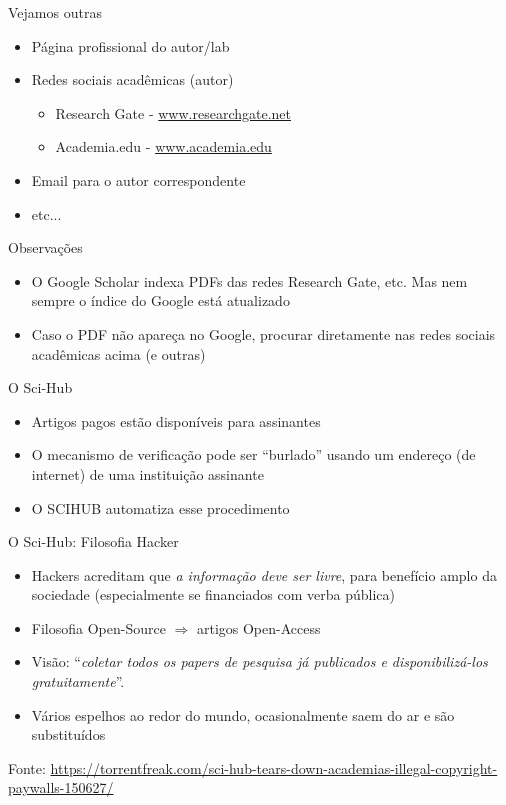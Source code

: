 \documentclass{beamer}
\begin{document}
\begin{frame}{Vejamos outras}
  \begin{itemize}
  \item Página profissional do autor/lab
  \item Redes sociais acadêmicas (autor)
    \begin{itemize}
    \item Research Gate - \url{www.researchgate.net}
    \item Academia.edu - \url{www.academia.edu}
    \end{itemize}
  \item Email para o autor correspondente
  \item etc...
  \end{itemize}
\end{frame}

\begin{frame}{Observações}
  \begin{itemize}
  \item O Google Scholar indexa PDFs das redes Research Gate, etc. Mas
    nem sempre o índice do Google está atualizado
  \item Caso o PDF não apareça no Google, procurar diretamente nas
    redes sociais acadêmicas acima (e outras)
  \end{itemize}
\end{frame}

\begin{frame}{O Sci-Hub}
  \begin{itemize}
  \item Artigos pagos estão disponíveis para assinantes
  \item O mecanismo de verificação pode ser ``burlado'' usando um
    endereço (de internet) de uma instituição assinante
  \item O SCIHUB automatiza esse procedimento
  \end{itemize}
\end{frame}

\begin{frame}{O Sci-Hub: Filosofia Hacker}
  \begin{itemize}
  \item Hackers acreditam que {\em a informação deve ser livre}, para
    benefício amplo da sociedade (\alert{especialmente} se financiados
    com verba pública)
  \item Filosofia Open-Source $\Rightarrow$ artigos Open-Access
  \item Visão: ``{\em coletar todos os papers de pesquisa já
      publicados e disponibilizá-los gratuitamente}''.
  \item Vários espelhos ao redor do mundo, ocasionalmente saem do ar e
    são substituídos
  \end{itemize}

  Fonte: \url{https://torrentfreak.com/sci-hub-tears-down-academias-illegal-copyright-paywalls-150627/}
\end{frame}
\end{document}
